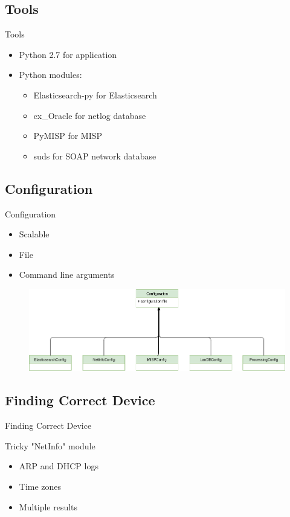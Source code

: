\documentclass{beamer}
\begin{document}
\subsection{Tools}
\begin{frame}{Tools}
\begin{block}{}
\begin{itemize}
    \item Python 2.7 for application
    \item Python modules:
    \begin{itemize}
        \item Elasticsearch-py for Elasticsearch
        \item cx\_Oracle for netlog database
        \item PyMISP for MISP
        \item suds for SOAP network database
    \end{itemize}
\end{itemize}
\end{block}
\end{frame}

\subsection{Configuration}
\begin{frame}{Configuration}
\begin{itemize}
    \item Scalable
    \item File
    \item Command line arguments
\end{itemize}

\begin{figure}
    \centering
    \includegraphics[width=\textwidth]{config.png}
\end{figure}
\end{frame}


\subsection{Finding Correct Device}
\begin{frame}{Finding Correct Device}
\begin{block}{Tricky "NetInfo" module}
\begin{itemize}
    \item ARP and DHCP logs
    \item Time zones
    \item Multiple results
\end{itemize}
\end{block}
\end{frame}
\end{document}
